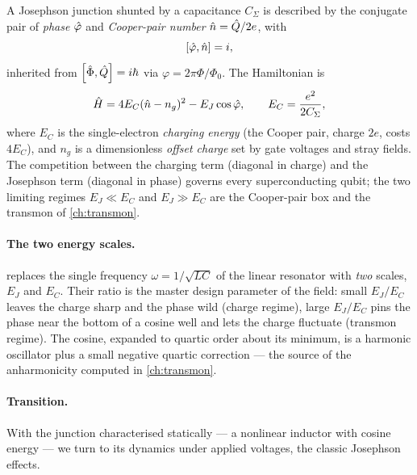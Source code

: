 \begin{statement}
\label{stmt:josephson-hamiltonian}
A Josephson junction shunted by a capacitance $C_\Sigma$ is described
by the conjugate pair of \emph{phase} $\hat{\varphi}$ and \emph{Cooper-pair
number} $\hat{n}=\hat{Q}/2e$, with
\begin{equation}
\label{eq:phase-number-commutator}
\comm{\op\varphi}{\op n}=i,
\end{equation}
inherited from $\comm{\op\Phi}{\op Q}=i\hbar$ via
$\varphi=2\pi\Phi/\Phi_0$. The Hamiltonian is
\begin{equation}
\label{eq:josephson-hamiltonian}
\hat{H} = 4E_C(\hat{n}-n_g)^2 - E_J\cos\hat{\varphi},
\qquad
E_C=\frac{e^2}{2C_\Sigma},
\end{equation}
where $E_C$ is the single-electron \emph{charging energy} (the Cooper
pair, charge $2e$, costs $4E_C$), and $n_g$ is a dimensionless
\emph{offset charge} set by gate voltages and stray fields. The
competition between the charging term (diagonal in charge) and the
Josephson term (diagonal in phase) governs every superconducting qubit;
the two limiting regimes $E_J\ll E_C$ and $E_J\gg E_C$ are the
Cooper-pair box and the transmon of \cref{ch:transmon}.
\end{statement}

\paragraph{The two energy scales.}
 replaces the single frequency
$\omega=1/\sqrt{LC}$ of the linear resonator with \emph{two} scales,
$E_J$ and $E_C$. Their ratio is the master design parameter of the
field: small $E_J/E_C$ leaves the charge sharp and the phase wild
(charge regime), large $E_J/E_C$ pins the phase near the bottom of a
cosine well and lets the charge fluctuate (transmon regime). The
cosine, expanded to quartic order about its minimum, is a harmonic
oscillator plus a small negative quartic correction --- the source of
the anharmonicity computed in \cref{ch:transmon}.

\paragraph{Transition.}
With the junction characterised statically --- a nonlinear inductor
with cosine energy --- we turn to its dynamics under applied voltages,
the classic Josephson effects.

